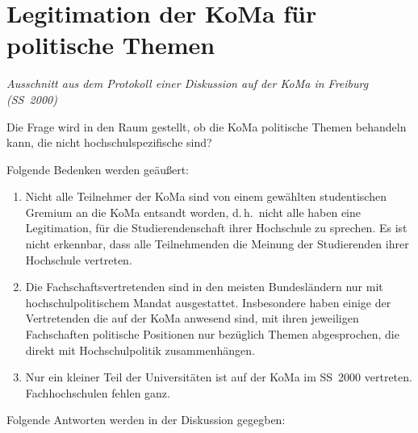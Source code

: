 \chapter{Legitimation der KoMa für politische Themen}


\emph{Ausschnitt aus dem Protokoll einer Diskussion auf der KoMa in Freiburg
(SS~2000)}

Die Frage wird in den Raum gestellt, ob die KoMa politische Themen behandeln
kann, die nicht hochschulspezifische sind?

Folgende Bedenken werden geäußert:
\begin{enumerate}
\item Nicht alle Teilnehmer der KoMa sind von einem gewählten studentischen
	Gremium an die KoMa entsandt worden, d.\,h.\ nicht alle haben eine
	Legitimation, für die Studierendenschaft ihrer Hochschule zu sprechen.  Es
	ist nicht erkennbar, dass alle Teilnehmenden die Meinung der Studierenden
	ihrer Hochschule vertreten.
\item Die Fachschaftsvertretenden sind in den meisten Bundesländern nur mit
	hochschulpolitischem Mandat ausgestattet.  Insbesondere haben einige der
	Vertretenden die auf der KoMa anwesend sind, mit ihren jeweiligen
	Fachschaften politische Positionen nur bezüglich Themen abgesprochen, die
	direkt mit Hochschulpolitik zusammenhängen.
\item Nur ein kleiner Teil der Universitäten ist auf der KoMa im SS~2000
	vertreten. Fachhochschulen fehlen ganz.
\end{enumerate}

Folgende Antworten werden in der Diskussion gegegben:

